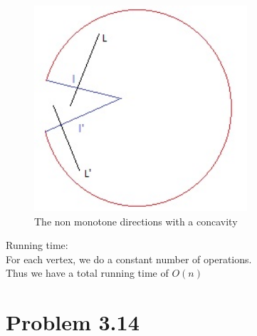\documentclass[11pt,psfig]{article}
\begin{document}
\begin{figure}[H]
\centering
\includegraphics[height=3in]{monotone_diagram.jpg}
\caption{The non monotone directions with a concavity}
\end{figure}

Running time:\\
For each vertex, we do a constant number of operations. \\
Thus we have a total running time of $O(n)$

\newpage

\section*{Problem 3.14}
\end{document}
